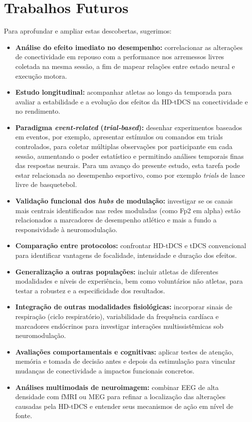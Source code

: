\section{Trabalhos Futuros}
Para aprofundar e ampliar estas descobertas, sugerimos:
\begin{itemize}
  \item \textbf{Análise do efeito imediato no desempenho:} correlacionar as alterações de conectividade em repouso com a performance nos arremessos livres coletada na mesma sessão, a fim de mapear relações entre estado neural e execução motora.
  \item \textbf{Estudo longitudinal:} acompanhar atletas ao longo da temporada para avaliar a estabilidade e a evolução dos efeitos da HD-tDCS na conectividade e no rendimento.
  \item \textbf{Paradigma \textit{event‑related} (\textit{trial‑based}):} desenhar experimentos baseados em eventos, por exemplo, apresentar estímulos ou comandos em trials controlados, para coletar múltiplas observações por participante em cada sessão, aumentando o poder estatístico e permitindo análises temporais finas das respostas neurais. Para um avanço do presente estudo, esta tarefa pode estar relacionada ao desempenho esportivo, como por exemplo \textit{trials} de lance livre de basquetebol.
  \item \textbf{Validação funcional dos \textit{hubs} de modulação:} investigar se os canais mais centrais identificados nas redes moduladas (como Fp2 em alpha) estão relacionados a marcadores de desempenho atlético e mais a fundo a responsividade à neuromodulação.
  \item \textbf{Comparação entre protocolos:} confrontar HD-tDCS e tDCS convencional para identificar vantagens de focalidade, intensidade e duração dos efeitos.
  \item \textbf{Generalização a outras populações:} incluir atletas de diferentes modalidades e níveis de experiência, bem como voluntários não atletas, para testar a robustez e a especificidade dos resultados.
  \item \textbf{Integração de outras modalidades fisiológicas:} incorporar sinais de respiração (ciclo respiratório), variabilidade da frequência cardíaca e marcadores endócrinos para investigar interações multissistêmicas sob neuromodulação.
  \item \textbf{Avaliações comportamentais e cognitivas:} aplicar testes de atenção, memória e tomada de decisão antes e depois da estimulação para vincular mudanças de conectividade a impactos funcionais concretos.
  \item \textbf{Análises multimodais de neuroimagem:} combinar EEG de alta densidade com fMRI ou MEG para refinar a localização das alterações causadas pela HD-tDCS e entender seus mecanismos de ação em nível de fonte.
\end{itemize}